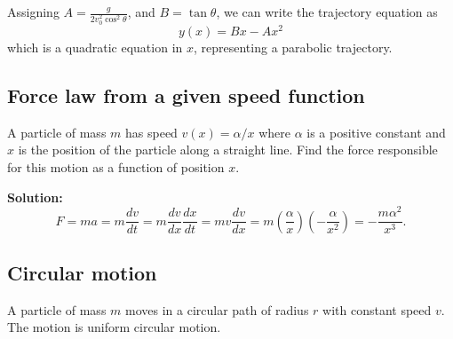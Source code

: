 \documentclass[../main.tex]{subfiles}
\begin{document}
Assigning $A = \frac{g}{2 v_0^2 \cos^2 \theta}$, and $B = \tan \theta$, we can write the trajectory equation as
\begin{equation}
    \boxed{y(x) = Bx - Ax^2}
\end{equation}
which is a quadratic equation in $x$, representing a parabolic trajectory.

\subsection{Force law from a given speed function}
A particle of mass $m$ has speed $v(x) = \alpha / x$ where $\alpha$ is a positive constant and $x$ is the position of the particle along a straight line. Find the force responsible for this motion as a function of position $x$.

\textbf{Solution:} 
\begin{equation}
    F = m a = m \frac{dv}{dt} = m \frac{dv}{dx} \frac{dx}{dt} = m v \frac{dv}{dx} = m \left(\frac{\alpha}{x}\right) \left(-\frac{\alpha}{x^2}\right) = -\frac{m \alpha^2}{x^3}.
\end{equation}



\subsection{Circular motion}
A particle of mass $m$ moves in a circular path of radius $r$ with constant speed $v$. The motion is uniform circular motion.
\end{document}
